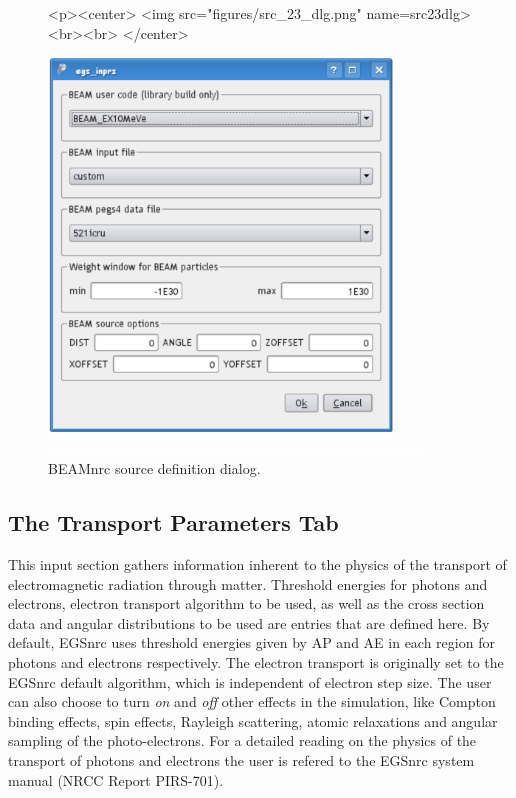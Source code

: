 \documentclass[12pt,twoside]{article}   %
\begin{document}
\begin{figure}[htb]
\begin{htmlonly}
\begin{rawhtml}
<p><center>
<img src="figures/src_23_dlg.png" name=src23dlg><br><br>
</center>
\end{rawhtml}
\end{htmlonly}
\begin{latexonly}
\begin{center}
\includegraphics[height=10cm]{figures/src_23_dlg}
\end{center}
\end{latexonly}
\begin{center}
\includegraphics[height=1mm]{figures/fake2}
\end{center}
\caption{BEAMnrc source definition dialog.}
\label{src23_dlg}
\end{figure}

\clearpage
\subsection{The Transport Parameters Tab}

This input section gathers information inherent to the physics of the transport of electromagnetic
radiation through matter. Threshold energies for photons and electrons, electron transport algorithm
to be used, as well as the cross section data and angular distributions to be used are entries that
are defined here. By default, EGSnrc uses threshold energies given by AP and AE in each region
for photons and electrons respectively. The electron transport is originally set to the EGSnrc default
algorithm, which is independent of electron step size. The user can also choose to turn {\em on}
and {\em off} other effects in the simulation, like Compton binding effects, spin effects, Rayleigh
scattering, atomic relaxations and angular sampling of the photo-electrons. For a detailed
reading on the physics of the transport of photons and electrons the user is refered to the
EGSnrc system manual (NRCC Report PIRS-701\cite{Ka09a}).\\
\end{document}
